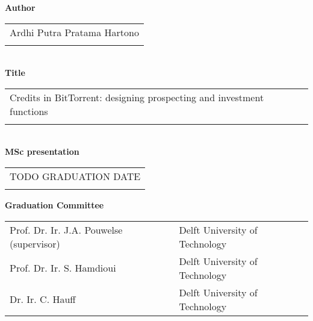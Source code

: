 \thispagestyle{empty}

\noindent \textbf{Author}\\
\begin{tabular}{l}
Ardhi Putra Pratama Hartono\\
\\
\end{tabular}\\
\noindent \textbf{Title}\\
\begin{tabular}{l}
Credits in BitTorrent: designing prospecting and investment functions\\
\\
\end{tabular}\\
\noindent \textbf{MSc presentation}\\
\begin{tabular}{l}
TODO GRADUATION DATE\\
\\
\end{tabular}

\vspace{1.1cm}

\noindent \textbf{Graduation Committee}\\
\begin{tabular}{ll}
Prof. Dr. Ir. J.A. Pouwelse (supervisor) & Delft University of Technology \\
Prof. Dr. Ir. S. Hamdioui & Delft University of Technology \\
Dr. Ir. C. Hauff & Delft University of Technology \\
\end{tabular}


